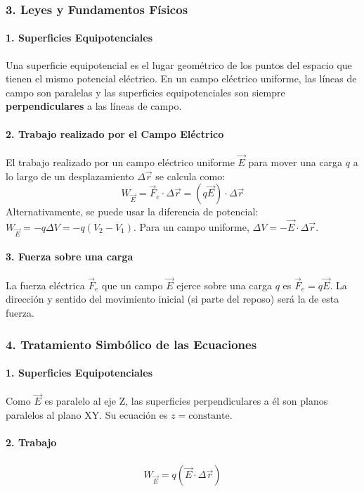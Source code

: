 \subsubsection*{3. Leyes y Fundamentos Físicos}
\paragraph*{1. Superficies Equipotenciales}
Una superficie equipotencial es el lugar geométrico de los puntos del espacio que tienen el mismo potencial eléctrico. En un campo eléctrico uniforme, las líneas de campo son paralelas y las superficies equipotenciales son siempre \textbf{perpendiculares} a las líneas de campo.

\paragraph*{2. Trabajo realizado por el Campo Eléctrico}
El trabajo realizado por un campo eléctrico uniforme $\vec{E}$ para mover una carga $q$ a lo largo de un desplazamiento $\Delta\vec{r}$ se calcula como:
$$ W_{\vec{E}} = \vec{F}_e \cdot \Delta\vec{r} = (q\vec{E}) \cdot \Delta\vec{r} $$
Alternativamente, se puede usar la diferencia de potencial: $W_{\vec{E}} = -q \Delta V = -q (V_2 - V_1)$. Para un campo uniforme, $\Delta V = -\vec{E} \cdot \Delta\vec{r}$.

\paragraph*{3. Fuerza sobre una carga}
La fuerza eléctrica $\vec{F}_e$ que un campo $\vec{E}$ ejerce sobre una carga $q$ es $\vec{F}_e = q\vec{E}$. La dirección y sentido del movimiento inicial (si parte del reposo) será la de esta fuerza.

\subsubsection*{4. Tratamiento Simbólico de las Ecuaciones}
\paragraph*{1. Superficies Equipotenciales}
Como $\vec{E}$ es paralelo al eje Z, las superficies perpendiculares a él son planos paralelos al plano XY. Su ecuación es $z = \text{constante}$.

\paragraph*{2. Trabajo}
\begin{gather}
    W_{\vec{E}} = q (\vec{E} \cdot \Delta\vec{r})
\end{gather}
